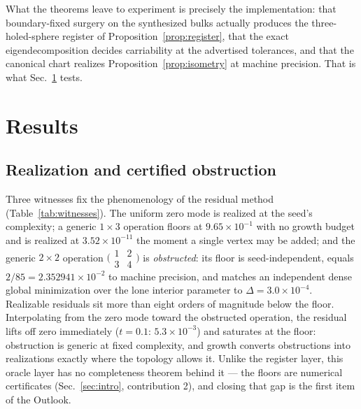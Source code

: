 \documentclass[a4paper,twocolumn,11pt,unpublished]{quantumarticle}
\theoremstyle{plain}
\theoremstyle{remark}
\begin{document}
What the theorems leave to experiment is precisely the implementation:
that boundary-fixed surgery on the synthesized bulks actually produces
the three-holed-sphere register of Proposition~\ref{prop:register}, that
the exact eigendecomposition decides carriability at the advertised
tolerances, and that the canonical chart realizes
Proposition~\ref{prop:isometry} at machine precision. That is what
Sec.~\ref{sec:results} tests.

\section{Results}
\label{sec:results}

\subsection{Realization and certified obstruction}
\label{sec:results-h1}

Three witnesses fix the phenomenology of the residual method
(Table~\ref{tab:witnesses}). The uniform zero mode is realized at the
seed's complexity; a generic $1\times3$ operation floors at
$9.65\times10^{-1}$ with no growth budget and is realized at
$3.52\times10^{-11}$ the moment a single vertex may be added; and the
generic $2\times2$ operation $\bigl(\begin{smallmatrix}1&2\\3&4
\end{smallmatrix}\bigr)$ is \emph{obstructed}: its floor is
seed-independent, equals $2/85=2.352941\times10^{-2}$ to machine
precision, and matches an independent dense global minimization over the
lone interior parameter to $\Delta=3.0\times10^{-4}$. Realizable residuals
sit more than eight orders of magnitude below the floor. Interpolating
from the zero mode toward the obstructed operation, the residual lifts off
zero immediately ($t=0.1$: $5.3\times10^{-3}$) and saturates at the floor:
obstruction is generic at fixed complexity, and growth converts
obstructions into realizations exactly where the topology allows it.
Unlike the register layer, this oracle layer has no completeness theorem
behind it --- the floors are numerical certificates
(Sec.~\ref{sec:intro}, contribution 2), and closing that gap is the first
item of the Outlook.
\end{document}

